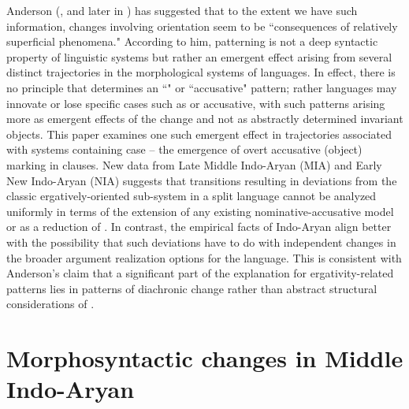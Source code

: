 \documentclass[output=paper,
modfonts
]{LSP/langsci}
\begin{document}
Anderson (\citeyear{anderson77}, and later in \citeyear{anderson2004})%
has suggested  that to the extent we have such information,  changes involving  orientation seem to be ``consequences of relatively superficial phenomena."   According to him,  patterning is not a deep syntactic property of linguistic systems  but rather an emergent effect arising  from several distinct trajectories in the morphological systems  of languages. In effect, there is no principle that determines  an ``" or ``accusative" pattern; rather languages may innovate or lose specific cases such as  or accusative, with such patterns arising more as emergent effects of the change and not   as abstractly determined invariant objects. 
This paper examines one such emergent effect in trajectories associated with systems containing  case  -- the emergence of overt accusative (object) marking in  clauses. New  data from Late Middle Indo-Aryan (MIA)  and Early New Indo-Aryan (NIA) suggests that transitions resulting in deviations from the classic ergatively-oriented sub-system in a split  language cannot be analyzed uniformly in terms of  the  extension of  any existing  nominative-accusative model or as a reduction of .  In contrast,  the empirical facts of Indo-Aryan  align better with  the possibility that such deviations have to do with independent changes in the broader argument realization options for the language. 
This is consistent with  Anderson's claim that a significant part of the explanation for ergativity-related patterns lies in  patterns of diachronic change rather than abstract structural considerations  of  \citep[contra][]{delancey1981,dixon94,tsunoda1985}.

\section{Morphosyntactic changes in Middle  Indo-Aryan } 
\end{document}
